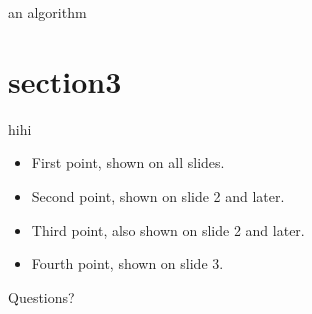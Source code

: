\documentclass[10pt]{beamer}
\begin{document}
\begin{frame}{an algorithm}
\end{frame}

\section{section3}
\begin{frame}{hihi}
  \begin{itemize}
    \item<1-> First point, shown on all slides.
    \item<2-> Second point, shown on slide 2 and later.
    \item<3-> Third point, also shown on slide 2 and later.
    \item<4-> Fourth point, shown on slide 3.
  \end{itemize}
\end{frame}

\begin{frame}
  \hspace{3cm}
  \Huge{Questions?}
\end{frame}
\end{document}
